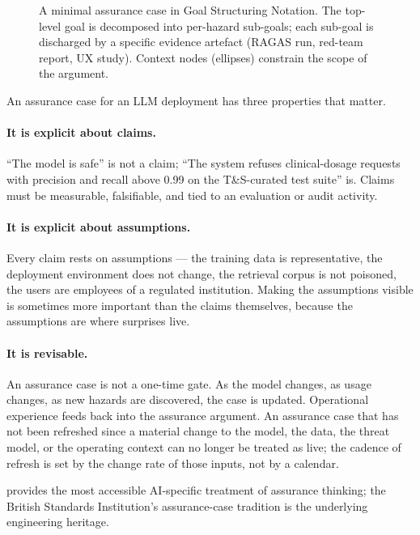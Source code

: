 \begin{figure}[ht]
  \centering
  
  \caption{A minimal assurance case in Goal Structuring Notation.
  The top-level goal is decomposed into per-hazard sub-goals; each
  sub-goal is discharged by a specific evidence artefact (RAGAS
  run, red-team report, UX study). Context nodes (ellipses)
  constrain the scope of the argument.}
  \label{fig:assurance-case}
\end{figure}

An assurance case for an LLM deployment has three properties that
matter.

\paragraph{It is explicit about claims.}
``The model is safe'' is not a claim; ``The system refuses
clinical-dosage requests with precision and recall above 0.99 on
the T\&S-curated test suite'' is. Claims must be measurable,
falsifiable, and tied to an evaluation or audit activity.

\paragraph{It is explicit about assumptions.}
Every claim rests on assumptions --- the training data is
representative, the deployment environment does not change, the
retrieval corpus is not poisoned, the users are employees of a
regulated institution. Making the assumptions visible is
sometimes more important than the claims themselves, because the
assumptions are where surprises live.

\paragraph{It is revisable.}
An assurance case is not a one-time gate. As the model changes,
as usage changes, as new hazards are discovered, the case is
updated. Operational experience feeds back into the assurance
argument. An assurance case that has not been refreshed since a
material change to the model, the data, the threat model, or the
operating context can no longer be treated as live; the cadence of
refresh is set by the change rate of those inputs, not by a
calendar.

\citet{leslie2021understanding} provides the most
accessible AI-specific treatment of assurance thinking; the
British Standards Institution's assurance-case tradition is the
underlying engineering heritage.

